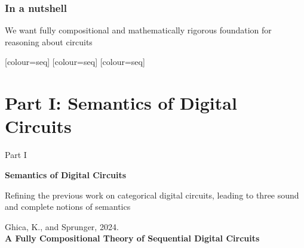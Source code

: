 
\begin{frame}
    \frametitle{In a nutshell}

    \LARGE
    \centering

    We want \alert{fully compositional} and \alert{mathematically rigorous}
    foundation for reasoning about circuits

    \vspace{1em}

    [colour=seq]
    [colour=seq]
    [colour=seq]

\end{frame}

\section{Part I: Semantics of Digital Circuits}

\begin{frame}

    \Huge
    \centering

    \pause
    Part I

    \pause

    \textbf{Semantics of Digital Circuits}

    \Large
    \vspace{0.25em}

    \pause

    Refining the previous work on categorical digital circuits, leading to
    three \alert{sound and complete} notions of semantics

    \large
    \vspace{0.5em}

    \pause

    Ghica, K., and Sprunger, 2024. \\
    \textbf{A Fully Compositional Theory of Sequential Digital Circuits}

\end{frame}

